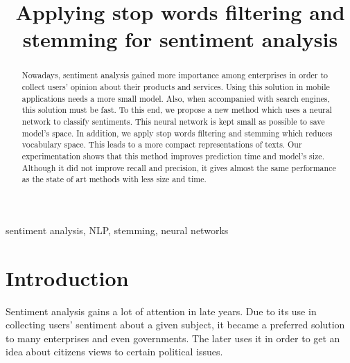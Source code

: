 \documentclass[conference]{IEEEtran}
\begin{document}
\title{Applying stop words filtering and stemming for sentiment analysis}

\author{

}

\maketitle

\begin{abstract}
Nowadays, sentiment analysis gained more importance among enterprises in order to collect users' opinion about their products and services. 
Using this solution in mobile applications needs a more small model.
Also, when accompanied with search engines, this solution must be fast.
To this end, we propose a new method which uses a neural network to classify sentiments.
This neural network is kept small as possible to save model's space.
In addition, we apply stop words filtering and stemming which reduces vocabulary space.
This leads to a more compact representations of texts.
Our experimentation shows that this method improves prediction time and model's size.
Although it did not improve recall and precision, it gives almost the same performance as the state of art methods with less size and time.
\end{abstract}

\begin{IEEEkeywords}
sentiment analysis, NLP, stemming, neural networks
\end{IEEEkeywords}

\section{Introduction}
Sentiment analysis gains a lot of attention in late years.
Due to its use in collecting users' sentiment about a given subject, it became a preferred solution to many enterprises and even governments.
The later uses it in order to get an idea about citizens views to certain political issues.
\end{document}
